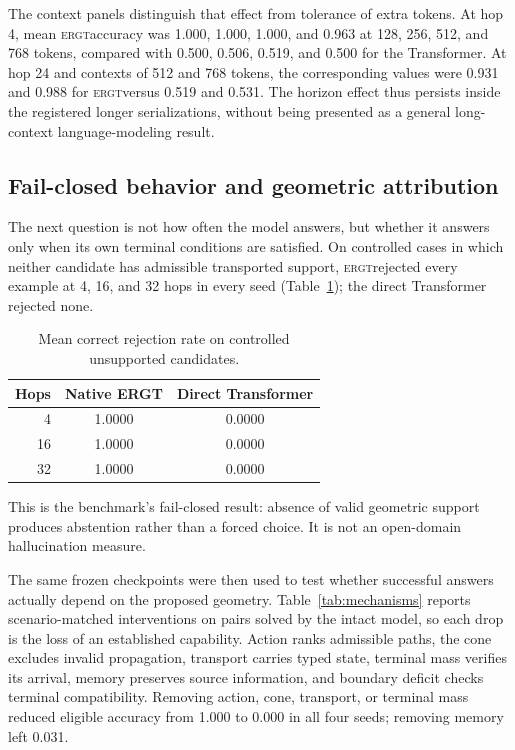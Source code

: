 \documentclass[11pt]{article}
\newcommand{\ERGT}{\textsc{ergt}}
\begin{document}
The context panels distinguish that effect from tolerance of extra tokens. At
hop 4, mean \ERGT accuracy was 1.000, 1.000, 1.000, and 0.963 at 128, 256,
512, and 768 tokens, compared with 0.500, 0.506, 0.519, and 0.500 for the
Transformer. At hop 24 and contexts of 512 and 768 tokens, the corresponding
values were 0.931 and 0.988 for \ERGT versus 0.519 and 0.531. The horizon
effect thus persists inside the registered longer serializations, without being
presented as a general long-context language-modeling result.

\subsection{Fail-closed behavior and geometric attribution}

The next question is not how often the model answers, but whether it answers
only when its own terminal conditions are satisfied. On controlled cases in
which neither candidate has admissible transported support, \ERGT rejected
every example at 4, 16, and 32 hops in every seed
(Table~\ref{tab:unsupported}); the direct Transformer rejected none.

\begin{table}[t]
\centering
\caption{Mean correct rejection rate on controlled unsupported candidates.}
\label{tab:unsupported}
\begin{tabular}{@{}rcc@{}}
\toprule
Hops & Native ERGT & Direct Transformer \\
\midrule
4  & 1.0000 & 0.0000 \\
16 & 1.0000 & 0.0000 \\
32 & 1.0000 & 0.0000 \\
\bottomrule
\end{tabular}
\end{table}

This is the benchmark's fail-closed result: absence of valid geometric support
produces abstention rather than a forced choice. It is not an open-domain
hallucination measure.

The same frozen checkpoints were then used to test whether successful answers
actually depend on the proposed geometry. Table~\ref{tab:mechanisms} reports
scenario-matched interventions on pairs solved by the intact model, so each
drop is the loss of an established capability. Action ranks admissible paths,
the cone excludes invalid propagation, transport carries typed state, terminal
mass verifies its arrival, memory preserves source information, and boundary
deficit checks terminal compatibility. Removing action, cone, transport, or
terminal mass reduced eligible accuracy from 1.000 to 0.000 in all four seeds;
removing memory left 0.031.
\end{document}
